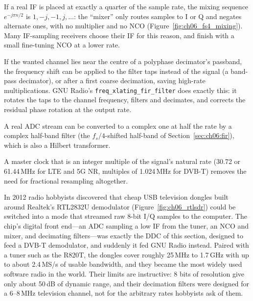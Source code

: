 \begin{description}[style=nextline,leftmargin=1.2em,font=\sffamily\bfseries\small\color{navy}]
\item[$f_s/4$ mixing.] If a real IF is placed at exactly a quarter of the sample rate, the mixing
sequence $e^{-j\pi n/2}$ is $1,-j,-1,j,\dots$: the ``mixer'' only routes samples to I or Q and negates
alternate ones, with no multiplier and no NCO (Figure~\ref{fig:ch06_fs4_mixing}). Many IF-sampling
receivers choose their IF for this reason, and finish with a small fine-tuning NCO at a lower rate.
\item[Mixing after decimation.] If the wanted channel lies near the centre of a polyphase decimator's
passband, the frequency shift can be applied to the filter taps instead of the signal (a band-pass
decimator), or after a first coarse decimation, saving high-rate multiplications. GNU Radio's
\texttt{freq\_xlating\_fir\_filter} does exactly this: it rotates the taps to the channel frequency,
filters and decimates, and corrects the residual phase rotation at the output rate.
\item[Real-to-complex in the filter.] A real ADC stream can be converted to a complex one at half the
rate by a complex half-band filter (the $f_s/4$-shifted half-band of Section~\ref{sec:ch06:fir}),
which is also a Hilbert transformer.
\item[Choose the converter clock.] A master clock that is an integer multiple of the signal's natural
rate (30.72 or 61.44\,MHz for LTE and 5G NR, multiples of 1.024\,MHz for DVB-T) removes the need for
fractional resampling altogether.
\end{description}


\begin{inpractice}
In 2012 radio hobbyists discovered that cheap USB television dongles built around Realtek's RTL2832U
demodulator (Figure~\ref{fig:ch06_rtlsdr}) could be switched into a mode that streamed raw 8-bit
I/Q samples to the computer. The chip's digital front end---an ADC sampling a low IF from the tuner,
an NCO and mixer, and decimating filters---was exactly the DDC of this section, designed to feed a
DVB-T demodulator, and suddenly it fed GNU Radio instead. Paired with a tuner such as the R820T, the
dongles cover roughly 25\,MHz to 1.7\,GHz with up to about 2.4\,MS/s of usable bandwidth, and they
became the most widely used software radio in the world. Their limits are instructive: 8 bits of
resolution give only about 50\,dB of dynamic range, and their decimation filters were designed for
a 6--8\,MHz television channel, not for the arbitrary rates hobbyists ask of them.
\end{inpractice}

